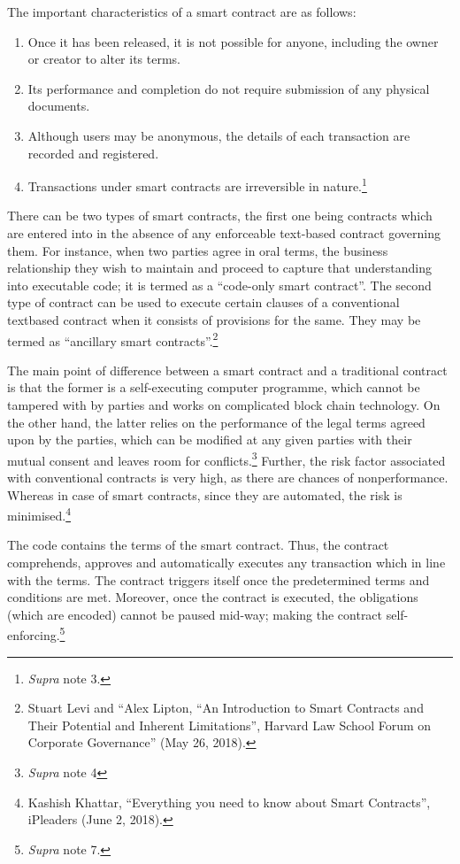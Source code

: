 \begin{multicols}{2}
\noi
The important characteristics of a smart contract are as follows:
\begin{enumerate}[label=$\bullet$]
\item Once it has been released, it is not possible for anyone, including the owner or creator to alter its terms.
\item Its performance and completion do not require submission of any physical documents.
\item Although users may be anonymous, the details of each transaction are recorded and registered.
\item Transactions under smart contracts are irreversible in nature.\footnote{\textit{Supra} note 3.}
\end{enumerate}

\noi
There can be two types of smart contracts, the first one being contracts which are entered into
in the absence of any enforceable text-based contract governing them. For instance, when two
parties agree in oral terms, the business relationship they wish to maintain and proceed to
capture that understanding into executable code; it is termed as a “code-only smart contract”.
The second type of contract can be used to execute certain clauses of a conventional textbased contract when it consists of provisions for the same. They may be termed as “ancillary
smart contracts”.\footnote{Stuart Levi and “Alex Lipton, “An Introduction to Smart Contracts and Their Potential and Inherent Limitations”, Harvard Law School Forum on Corporate Governance” (May 26, 2018).}

\noi
The main point of difference between a smart contract and a traditional contract is that the
former is a self-executing computer programme, which cannot be tampered with by parties
and works on complicated block chain technology. On the other hand, the latter relies on the
performance of the legal terms agreed upon by the parties, which can be modified at any
given parties with their mutual consent and leaves room for conflicts.\footnote{\textit{Supra} note 4} Further, the risk
factor associated with conventional contracts is very high, as there are chances of nonperformance. Whereas in case of smart contracts, since they are automated, the risk is
minimised.\footnote{Kashish Khattar, “Everything you need to know about Smart Contracts”, iPleaders (June 2, 2018).}


\noi
The code contains the terms of the smart contract. Thus, the contract comprehends, approves
and automatically executes any transaction which in line with the terms. The contract triggers
itself once the predetermined terms and conditions are met. Moreover, once the contract is
executed, the obligations (which are encoded) cannot be paused mid-way; making the
contract self-enforcing.\footnote{\textit{Supra} note 7.}


\end{multicols}
